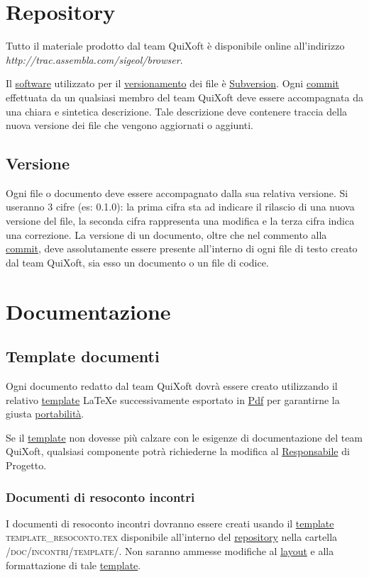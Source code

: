 \documentclass[11pt,a4paper]{article}
\begin{document}
\section{Repository}
Tutto il materiale prodotto dal team QuiXoft è disponibile online all'indirizzo \textit{http://trac.assembla.com/sigeol/browser}.

Il \underline{software} utilizzato per il \underline{versionamento} dei file è \underline{Subversion}.
O\-gni \underline{commit} effettuata da un qualsiasi membro del team QuiXoft deve essere accompagnata da una chiara e sintetica descrizione. Tale descrizione deve contenere traccia della nuova versione dei file che vengono aggiornati o aggiunti.
\subsection{Versione}
Ogni file o documento deve essere accompagnato dalla sua relativa versione. Si useranno 3 cifre (es: 0.1.0): la prima cifra sta ad indicare il rilascio di una nuova versione del file, la seconda cifra rappresenta una modifica e la terza cifra indica una correzione. La versione di un documento, oltre che nel commento alla \underline{commit}, deve assolutamente essere presente all'interno di ogni file di testo creato dal team QuiXoft, sia esso un documento o un file di codice.
\section{Documentazione}
\subsection{Template documenti}
Ogni documento redatto dal team QuiXoft dovrà essere creato utilizzando il relativo \underline{template} \LaTeX \space e successivamente esportato in \underline{Pdf} per garantirne la giusta \underline{portabilità}.

Se il \underline{template} non dovesse più calzare con le esigenze di documentazione del team QuiXoft, qualsiasi componente potrà richiederne la modifica al \underline{Responsabile} di Progetto.
\subsubsection{Documenti di resoconto incontri}
I documenti di resoconto incontri dovranno essere creati usando il \underline{template} \textsc{template\_resoconto.tex} disponibile all'interno del \underline{repository} nella car\-tella \textsc{/doc/incontri/template/}. Non saranno ammesse modifiche al \underline{layout} e alla formattazione di tale \underline{template}.
\end{document}
